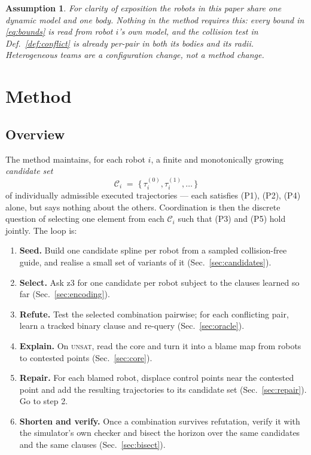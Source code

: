 \documentclass[conference]{IEEEtran}
\newtheorem{assumption}{Assumption}
\newcommand{\Cand}{\mathcal{C}}
\begin{document}
\begin{assumption}
\label{ass:homog}
For clarity of exposition the robots in this paper share one dynamic model and one body.
Nothing in the method requires this: every bound in \eqref{eq:bounds} is read from robot
$i$'s own model, and the collision test in Def.~\ref{def:conflict} is already per-pair in
both its bodies and its radii. Heterogeneous teams are a
configuration change, not a method change.
\end{assumption}

\section{Method}
\label{sec:method}

\subsection{Overview}

The method maintains, for each robot $i$, a finite and monotonically growing
\emph{candidate set}
\[
  \Cand_i \;=\; \{\,\tau_i^{(0)}, \tau_i^{(1)}, \dots\,\}
\]
of individually admissible executed trajectories --- each satisfies (P1), (P2), (P4) alone,
but says nothing about the others. Coordination is then the discrete question of selecting
one element from each $\Cand_i$ such that (P3) and (P5) hold jointly. The loop is:

\begin{enumerate}
  \item \textbf{Seed.} Build one candidate spline per robot from a sampled collision-free
        guide, and realise a small set of variants of it (Sec.~\ref{sec:candidates}).
  \item \textbf{Select.} Ask z3 for one candidate per robot subject to the clauses learned
        so far (Sec.~\ref{sec:encoding}).
  \item \textbf{Refute.} Test the selected combination pairwise; for each conflicting pair,
        learn a tracked binary clause and re-query (Sec.~\ref{sec:oracle}).
  \item \textbf{Explain.} On \textsc{unsat}, read the core and turn it into a blame map
        from robots to contested points (Sec.~\ref{sec:core}).
  \item \textbf{Repair.} For each blamed robot, displace control points near the contested
        point and add the resulting trajectories to its candidate set
        (Sec.~\ref{sec:repair}). Go to step 2.
  \item \textbf{Shorten and verify.} Once a combination survives refutation, verify it with
        the simulator's own checker and bisect the horizon over the same candidates and the
        same clauses (Sec.~\ref{sec:bisect}).
\end{enumerate}
\end{document}
